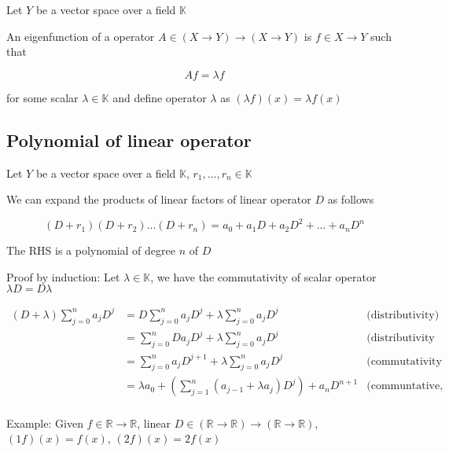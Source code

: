 \documentclass{article}
\begin{document}
Let $Y$ be a vector space over a field $\mathbb{K}$

An eigenfunction of a operator $A \in (X \to Y) \to (X \to Y)$ is $f \in X \to Y$ such that

\begin{equation}
    A f = \lambda f
\end{equation}

for some scalar $\lambda \in \mathbb{K}$ and define operator $\lambda$ as $(\lambda f)(x) = \lambda f(x)$

\subsection{Polynomial of linear operator}
Let $Y$ be a vector space over a field $\mathbb{K}$, $r_1, ..., r_n \in \mathbb{K}$

We can expand the products of linear factors of linear operator $D$ as follows

\begin{equation}
    (D+r_1)(D+r_2)...(D+r_n) = a_0 + a_1 D + a_2 D^2 + ... + a_n D^n
\end{equation}


The RHS is a polynomial of degree $n$ of $D$

Proof by induction: Let $\lambda \in \mathbb{K}$, we have the commutativity of scalar operator $\lambda D = D \lambda$

\begin{align*}
    (D + \lambda) \sum_{j=0}^n a_j D^j  &= D \sum_{j=0}^n a_j D^j + \lambda \sum_{j=0}^n a_j D^j &\text{(distributivity)} \\
                                        &= \sum_{j=0}^n D a_j D^j + \lambda \sum_{j=0}^n a_j D^j &\text{(distributivity of linear operator)} \\
                                        &= \sum_{j=0}^{n} a_j D^{j+1} + \lambda \sum_{j=0}^n a_j D^j &\text{(commutativity of scalar operator)} \\
                                        &= \lambda a_0 + (\sum_{j=1}^{n} (a_{j-1} + \lambda a_j) D^j) + a_n D^{n+1} &\text{(communtative, associative of addition)} \\
\end{align*}



Example: Given $f \in \mathbb{R} \to \mathbb{R}$, linear $D \in (\mathbb{R} \to \mathbb{R}) \to (\mathbb{R} \to \mathbb{R})$, $(1f)(x) = f(x)$, $(2f)(x) = 2f(x)$
\end{document}
